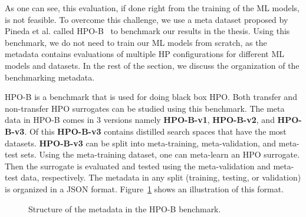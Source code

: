 \documentclass[12pt, twoside, ngerman]{report}
\begin{document}
As one can see,  this evaluation, if done right from the training of the ML models, is not feasible.
To overcome this challenge, we use a meta dataset proposed by Pineda
 et al. called HPO-B~\cite{DBLP:journals/corr/abs-2106-06257} to benchmark our results in the thesis.
Using this benchmark, we do not need to train our ML models from scratch, as the metadata contains evaluations of multiple HP configurations for different ML models and datasets.
In the rest of the section, we discuss the organization of the benchmarking metadata.

HPO-B is a benchmark that is used for doing black box HPO.
Both transfer and non-transfer HPO surrogates can be studied using this benchmark.
The meta data in HPO-B comes in 3 versions namely \textbf{HPO-B-v1},  \textbf{HPO-B-v2}, and \textbf{HPO-B-v3}.
Of this \textbf{HPO-B-v3} contains distilled search spaces that have the most datasets. \textbf{HPO-B-v3} can be split into meta-training, meta-validation, and meta-test sets. 
Using the meta-training dataset, one can meta-learn an HPO surrogate.
Then the surrogate is evaluated and tested using the meta-validation and meta-test data, respectively.
The metadata in any split (training, testing, or validation) is organized in a JSON format. Figure~\ref{fig:metadataorganization} shows an illustration of this format.

\begin{figure}[htb]
\centering
{}
\caption{Structure of the metadata in the HPO-B benchmark.}
\label{fig:metadataorganization}
\end{figure}
\end{document}
